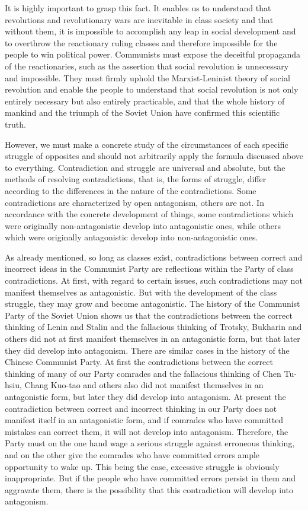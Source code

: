 \documentclass{article}
\begin{document}
It is highly important to grasp this fact. It enables us to understand that
revolutions and revolutionary wars are inevitable in class society and that
without them, it is impossible to accomplish any leap in social development and
to overthrow the reactionary ruling classes and therefore impossible for the
people to win political power. Communists must expose the deceitful propaganda
of the reactionaries, such as the assertion that social revolution is
unnecessary and impossible. They must firmly uphold the Marxist-Leninist theory
of social revolution and enable the people to understand that social revolution
is not only entirely necessary but also entirely practicable, and that the
whole history of mankind and the triumph of the Soviet Union have confirmed
this scientific truth.

However, we must make a concrete study of the circumstances of each specific
struggle of opposites and should not arbitrarily apply the formula discussed
above to everything. Contradiction and struggle are universal and absolute, but
the methods of resolving contradictions, that is, the forms of struggle, differ
according to the differences in the nature of the contradictions. Some
contradictions are characterized by open antagonism, others are not. In
accordance with the concrete development of things, some contradictions which
were originally non-antagonistic develop into antagonistic ones, while others
which were originally antagonistic develop into non-antagonistic ones.

As already mentioned, so long as classes exist, contradictions between correct
and incorrect ideas in the Communist Party are reflections within the Party of
class contradictions. At first, with regard to certain issues, such
contradictions may not manifest themselves as antagonistic. But with the
development of the class struggle, they may grow and become antagonistic. The
history of the Communist Party of the Soviet Union shows us that the
contradictions between the correct thinking of Lenin and Stalin and the
fallacious thinking of Trotsky, Bukharin and others did not at first manifest
themselves in an antagonistic form, but that later they did develop into
antagonism. There are similar cases in the history of the Chinese Communist
Party. At first the contradictions between the correct thinking of many of our
Party comrades and the fallacious thinking of Chen Tu-hsiu, Chang Kuo-tao and
others also did not manifest themselves in an antagonistic form, but later they
did develop into antagonism. At present the contradiction between correct and
incorrect thinking in our Party does not manifest itself in an antagonistic
form, and if comrades who have committed mistakes can correct them, it will not
develop into antagonism. Therefore, the Party must on the one hand wage
a serious struggle against erroneous thinking, and on the other give the
comrades who have committed errors ample opportunity to wake up. This being the
case, excessive struggle is obviously inappropriate. But if the people who have
committed errors persist in them and aggravate them, there is the possibility
that this contradiction will develop into antagonism.
\end{document}
